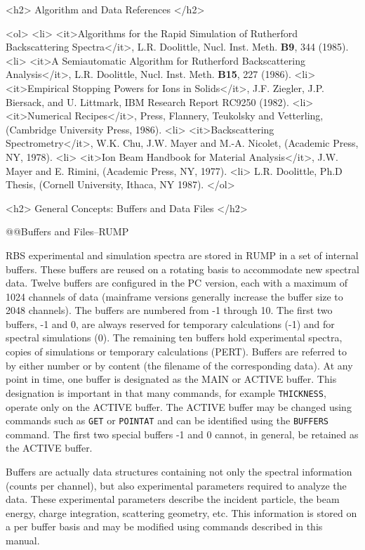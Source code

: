 <h2> Algorithm and Data References </h2>

<ol>
  <li> <it>Algorithms for the Rapid Simulation of Rutherford Backscattering
       Spectra</it>, L.R. Doolittle, Nucl. Inst. Meth. {\bf B9}, 344 (1985).
  <li> <it>A Semiautomatic Algorithm for Rutherford Backscattering Analysis</it>,
       L.R. Doolittle, Nucl. Inst. Meth. {\bf B15}, 227 (1986).
  <li> <it>Empirical Stopping Powers for Ions in Solids</it>, J.F. Ziegler, J.P. 
       Biersack, and U. Littmark, IBM Research Report RC9250 (1982).
  <li> <it>Numerical Recipes</it>, Press, Flannery, Teukolsky and Vetterling,
       (Cambridge University Press, 1986).
  <li> <it>Backscattering Spectrometry</it>, W.K. Chu, J.W. Mayer and M.-A.
       Nicolet, (Academic Press, NY, 1978).
  <li> <it>Ion Beam Handbook for Material Analysis</it>, J.W. Mayer and E. 
       Rimini, (Academic Press, NY, 1977).
  <li> L.R. Doolittle, Ph.D Thesis, (Cornell University, Ithaca, NY 1987).
</ol>

<h2> General Concepts: Buffers and Data Files </h2>

@@{Buffers and Files--RUMP}

RBS experimental and simulation spectra are stored in RUMP in a set of
internal buffers.  These buffers are reused on a rotating basis to accommodate
new spectral data.  Twelve buffers are configured in the PC version, each
with a maximum of 1024 channels of data (mainframe versions generally increase
the buffer size to 2048 channels).  The buffers are numbered from -1 through
10.  The first two buffers, -1 and 0, are always reserved for temporary
calculations (-1) and for spectral simulations (0).  The remaining ten buffers
hold experimental spectra, copies of simulations or temporary calculations
(PERT).  Buffers are referred to by either number or by content (the filename
of the corresponding data).  At any point in time, one buffer is designated as
the MAIN or ACTIVE buffer.  This designation is important in that many
commands, for example {\tt THICKNESS}, operate only on the ACTIVE buffer.  The
ACTIVE buffer may be changed using commands such as {\tt GET} or {\tt POINTAT}
and can be identified using the {\tt BUFFERS} command.  The first two special
buffers -1 and 0 cannot, in general, be retained as the ACTIVE buffer.

Buffers are actually data structures containing not only the spectral
information (counts per channel), but also experimental parameters required
to analyze the data.  These experimental parameters describe the incident
particle, the beam energy, charge integration, scattering geometry, etc.  This
information is stored on a per buffer basis and may be modified using commands
described in this manual.

